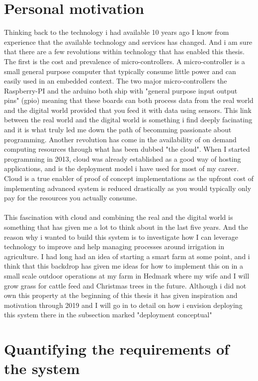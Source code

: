 \documentclass[]{uiophd}
\begin{document}
\section{Personal motivation}
Thinking back to the technology i had available 10 years ago I know from experience that the available technology and services has changed. And i am sure that there are a few revolutions within technology that has enabled this thesis. The first is the cost and prevalence of micro-controllers. A micro-controller is a small general purpose computer that typically consume little power and can easily used in an embedded context. The two major micro-controllers the Raspberry-PI and the arduino both ship with "general purpose input output pins" (gpio) meaning that these boards can both process data from the real world and the digital world provided that you feed it with data using sensors. This link between the real world and the digital world is something i find deeply facinating and it is what truly led me down the path of becomming passionate about programming. Another revolution has come in the availability of on demand computing resources through what has been dubbed "the cloud". When I started programming in 2013, cloud was already established as a good way of hosting applications, and is the deployment model i have used for most of my career. Cloud is a true enabler of proof of concept implementations as the upfront cost of implementing advanced system is reduced drastically as you would typically only pay for the resources you actually consume.
\\\\
This fascination with cloud and combining the real and the digital world is something that has given me a lot to think about in the last five years. And the reason why i wanted to build this system is to investigate how I can leverage technology to improve and help managing processes around irrigation in agriculture. I had long had an idea of starting a smart farm at some point, and i think that this backdrop has given me ideas for how to implement this on in a small scale outdoor operations at my farm in Hedmark where my wife and I will grow grass for cattle feed and Christmas trees in the future. Although i did not own this property at the beginning of this thesis it has given inspiration and motivation through 2019 and I will go in to detail on how i envision deploying this system there in the subsection marked "deployment conceptual"

\section{Quantifying the requirements of the system}
\end{document}
